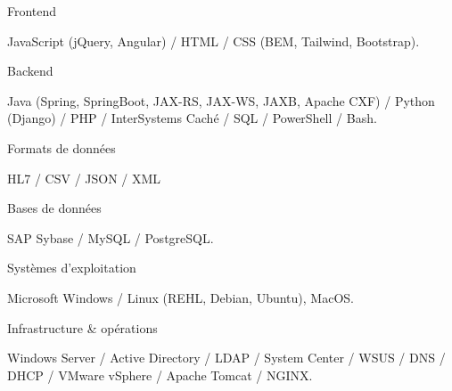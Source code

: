 


\begin{cventries}

\cventrytitleanddescription
    {Frontend}
    {
    JavaScript (jQuery, Angular) / HTML / CSS (BEM, Tailwind, Bootstrap).
    
    }
 \cventrytitleanddescription
    {Backend}
    {
    Java (Spring, SpringBoot, JAX-RS, JAX-WS, JAXB, Apache CXF) / Python (Django) / PHP / InterSystems Caché / SQL / PowerShell / Bash.
    
    }
    
    
 \cventrytitleanddescription
    {Formats de données}
    {
    HL7 / CSV / JSON / XML
    
    }
    
    
 \cventrytitleanddescription
    {Bases de données}
    {
    SAP Sybase / MySQL / PostgreSQL.
    
    }
    
 \cventrytitleanddescription
    {Systèmes d'exploitation}
    {
    Microsoft Windows / Linux (REHL, Debian, Ubuntu), MacOS.
    
    }
    
 \cventrytitleanddescription
    {Infrastructure \& opérations}
    {
    Windows Server / Active Directory / LDAP / System Center / WSUS / DNS / DHCP / VMware vSphere / Apache Tomcat / NGINX.
    
    }

\end{cventries}
